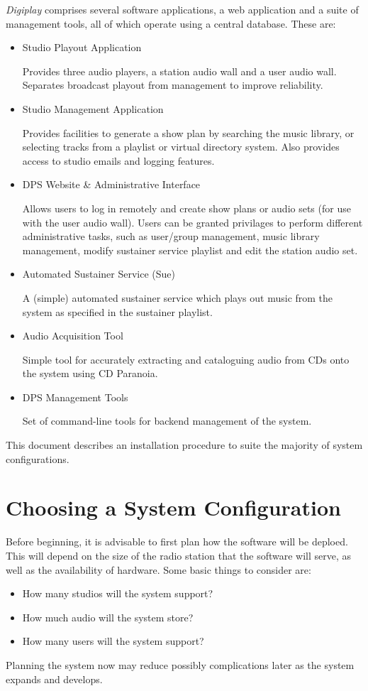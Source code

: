 \documentclass[a4paper,12pt]{report}
\numberwithin{equation}{section}
\begin{document}
\emph{Digiplay} comprises several software applications, a web application and a suite of management tools, all of which operate using a central database. These are:
\begin{itemize}
\item Studio Playout Application\par
Provides three audio players, a station audio wall and a user audio wall. Separates broadcast playout from management to improve reliability.
\item Studio Management Application\par
Provides facilities to generate a show plan by searching the music library, or selecting tracks from a playlist or virtual directory system. Also provides access to studio emails and logging features.
\item DPS Website \& Administrative Interface\par
Allows users to log in remotely and create show plans or audio sets (for use with the user audio wall). Users can be granted privilages to perform different administrative tasks, such as user/group management, music library management, modify sustainer service playlist and edit the station audio set.
\item Automated Sustainer Service (Sue)\par
A (simple) automated sustainer service which plays out music from the system as specified in the sustainer playlist.
\item Audio Acquisition Tool\par
Simple tool for accurately extracting and cataloguing audio from CDs onto the system using CD Paranoia.
\item DPS Management Tools\par
Set of command-line tools for backend management of the system.
\end{itemize}
This document describes an installation procedure to suite the majority of system configurations.

\chapter{Choosing a System Configuration}
Before beginning, it is advisable to first plan how the software will be deploed. This will depend on the size of the radio station that the software will serve, as well as the availability of hardware. Some basic things to consider are:
\begin{itemize}
\item How many studios will the system support?
\item How much audio will the system store?
\item How many users will the system support?
\end{itemize}
Planning the system now may reduce possibly complications later as the system expands and develops.
\end{document}
